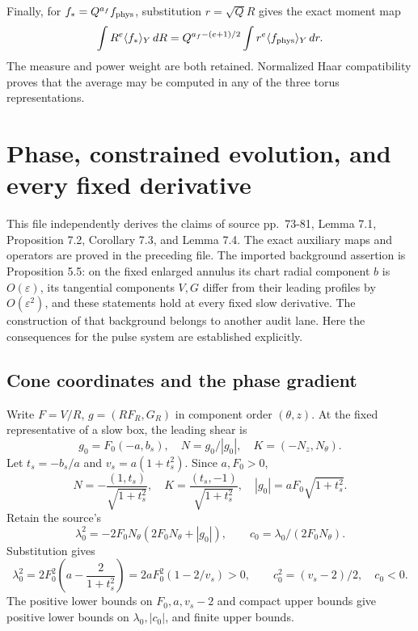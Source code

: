 \documentclass[10pt,a4paper]{article}
\begin{document}
Finally, for \(f_*=Q^{a_f}f_{\rm phys}\), substitution \(r=\sqrt Q R\) gives the exact moment map \[
\int R^e\langle f_*\rangle_Y\,dR
=Q^{a_f-(e+1)/2}\int r^e\langle f_{\rm phys}\rangle_Y\,dr.
\] The measure and power weight are both retained. Normalized Haar compatibility proves that the average may be computed in any of the three torus representations.

\section{Phase, constrained evolution, and every fixed derivative}\label{phase-constrained-evolution-and-every-fixed-derivative}

This file independently derives the claims of source pp.~73-81, Lemma 7.1, Proposition 7.2, Corollary 7.3, and Lemma 7.4. The exact auxiliary maps and operators are proved in the preceding file. The imported background assertion is Proposition 5.5: on the fixed enlarged annulus its chart radial component \(b\) is \(O(\varepsilon)\), its tangential components \(V,G\) differ from their leading profiles by \(O(\varepsilon^2)\), and these statements hold at every fixed slow derivative. The construction of that background belongs to another audit lane. Here the consequences for the pulse system are established explicitly.

\subsection{Cone coordinates and the phase gradient}\label{cone-coordinates-and-the-phase-gradient}

Write \(F=V/R\), \(g=(RF_R,G_R)\) in component order \((\theta,z)\). At the fixed representative of a slow box, the leading shear is \[
g_0=F_0(-a,b_s),\quad N=g_0/|g_0|,\quad K=(-N_z,N_\theta).
\] Let \(t_s=-b_s/a\) and \(v_s=a(1+t_s^2)\). Since \(a,F_0>0\), \[
N=-\frac{(1,t_s)}{\sqrt{1+t_s^2}},\quad
K=\frac{(t_s,-1)}{\sqrt{1+t_s^2}},\quad
|g_0|=aF_0\sqrt{1+t_s^2}.
\] Retain the source's \[
\lambda_0^2=-2F_0N_\theta(2F_0N_\theta+|g_0|),
\qquad c_0=\lambda_0/(2F_0N_\theta).
\] Substitution gives \[
\lambda_0^2
=2F_0^2\left(a-\frac2{1+t_s^2}\right)
=2aF_0^2(1-2/v_s)>0,\qquad
c_0^2=(v_s-2)/2,\quad c_0<0.
\] The positive lower bounds on \(F_0,a,v_s-2\) and compact upper bounds give positive lower bounds on \(\lambda_0,|c_0|\), and finite upper bounds.
\end{document}
